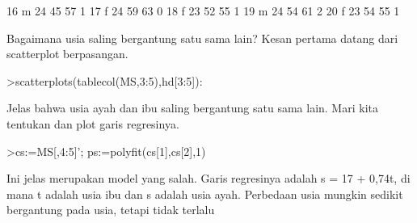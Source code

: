 \documentclass[a4paper,10pt]{article}
\begin{document}
\begin{eulernotebook}
\begin{eulercomment}
\begin{eulercomment}
\begin{eulercomment}
\begin{eulercomment}
\begin{eulercomment}
\begin{eulercomment}
\begin{eulercomment}
\begin{eulercomment}
\begin{eulercomment}
\begin{eulercomment}
\begin{eulercomment}
\begin{eulercomment}
\begin{eulercomment}
\begin{eulercomment}
\begin{eulercomment}
\begin{eulercomment}
\begin{eulercomment}
\begin{eulercomment}
\begin{eulercomment}
\begin{eulercomment}
\begin{eulercomment}
\begin{eulercomment}
\begin{eulercomment}
\begin{eulercomment}
\begin{eulercomment}
\begin{eulercomment}
\begin{eulercomment}
\begin{eulercomment}
\begin{eulercomment}
\begin{eulercomment}
\begin{eulercomment}
\begin{eulercomment}
\begin{eulercomment}
\begin{eulercomment}
\begin{eulercomment}
\begin{eulercomment}
\begin{eulercomment}
\begin{eulercomment}
\begin{eulercomment}
\begin{eulercomment}
\begin{eulercomment}
\begin{eulercomment}
\begin{eulercomment}
\begin{eulercomment}
\begin{euleroutput}
          16         m        24        45        57         1
          17         f        24        59        63         0
          18         f        23        52        55         1
          19         m        24        54        61         2
          20         f        23        54        55         1
\end{euleroutput}
\begin{eulercomment}
Bagaimana usia saling bergantung satu sama lain? Kesan pertama datang
dari scatterplot berpasangan.
\end{eulercomment}
\begin{eulerprompt}
>scatterplots(tablecol(MS,3:5),hd[3:5]):
\end{eulerprompt}
\begin{eulercomment}
Jelas bahwa usia ayah dan ibu saling bergantung satu sama lain. Mari
kita tentukan dan plot garis regresinya.
\end{eulercomment}
\begin{eulerprompt}
>cs:=MS[,4:5]'; ps:=polyfit(cs[1],cs[2],1)
\end{eulerprompt}
\begin{euleroutput}
  [17.3789,  0.740964]
\end{euleroutput}
\begin{eulercomment}
Ini jelas merupakan model yang salah. Garis regresinya adalah s = 17 +
0,74t, di mana t adalah usia ibu dan s adalah usia ayah. Perbedaan
usia mungkin sedikit bergantung pada usia, tetapi tidak terlalu

\end{eulercomment}
\end{eulercomment}
\end{eulercomment}
\end{eulercomment}
\end{eulercomment}
\end{eulercomment}
\end{eulercomment}
\end{eulercomment}
\end{eulercomment}
\end{eulercomment}
\end{eulercomment}
\end{eulercomment}
\end{eulercomment}
\end{eulercomment}
\end{eulercomment}
\end{eulercomment}
\end{eulercomment}
\end{eulercomment}
\end{eulercomment}
\end{eulercomment}
\end{eulercomment}
\end{eulercomment}
\end{eulercomment}
\end{eulercomment}
\end{eulercomment}
\end{eulercomment}
\end{eulercomment}
\end{eulercomment}
\end{eulercomment}
\end{eulercomment}
\end{eulercomment}
\end{eulercomment}
\end{eulercomment}
\end{eulercomment}
\end{eulercomment}
\end{eulercomment}
\end{eulercomment}
\end{eulercomment}
\end{eulercomment}
\end{eulercomment}
\end{eulercomment}
\end{eulercomment}
\end{eulercomment}
\end{eulercomment}
\end{eulercomment}
\end{eulernotebook}
\end{document}
